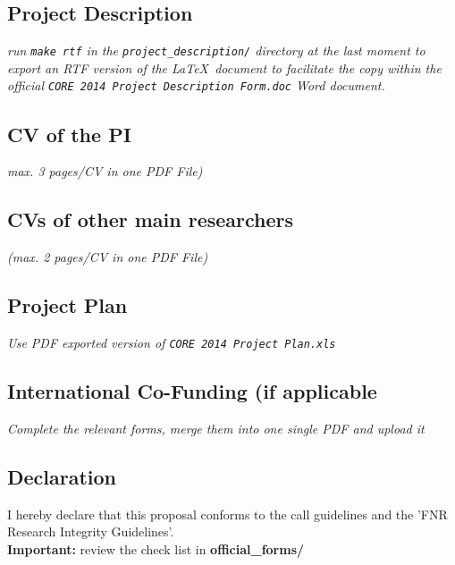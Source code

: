 \documentclass[11pt,twoside,a4paper]{article}
\newcommand{\Attachment}[1]{
  \IfFileExists {#1}{}
}
\begin{document}
\subsection{Project Description}
\emph{run \texttt{make rtf} in the \texttt{project\_description/} directory at
  the last moment to export an RTF version of the \LaTeX\ document to facilitate the copy within
  the official \texttt{CORE\ 2014\ Project\ Description\ Form.doc} Word
  document. }


\subsection{CV of the PI}
\emph{max. 3 pages/CV in one PDF File)}

\Attachment {CVs/cv-PI.pdf}


\subsection{CVs of other main researchers}
\emph{ (max. 2 pages/CV in one PDF File)}


\subsection{Project Plan}
\emph{Use PDF exported version of \texttt{CORE\ 2014\ Project\ Plan.xls}}

\subsection{International Co-Funding (if applicable}
\emph{Complete the relevant forms, merge them into one single PDF and upload it}


\subsection{Declaration}


I hereby declare that this proposal conforms to the call guidelines and the 'FNR
Research Integrity Guidelines'.
\\

\noindent 
\textbf{Important:} review the check list in \textbf{official\_forms/}




\end{document}
